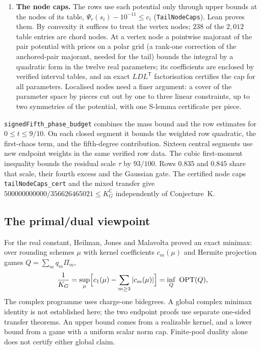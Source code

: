 \documentclass[11pt,a4paper]{article}
\newcommand{\C}{\mathbb{C}}
\newcommand{\KG}{K_G^{\C}}
\newcommand{\lean}[1]{\texttt{\small #1}}
\begin{document}
\begin{enumerate}
 the potential. Lean checks this on the quadratic and affine branches of $\varphi_c(\tau v/\delta)$ in $v=\sqrt U$, with $\delta=3/4$. Convexity gives the bounds
 between witness scales. The kernel checks these polynomial inequalities and the cover of $0\le x\le31/4$.
 The amplitude cover has 38 base intervals. In the active intervals the mixing weight is
 a clipped affine function of $t$. The discount is bounded below by the chord between its
 endpoint weights. Subtracting it leaves a quadratic in the segment parameter, whose
 maximum is checked at the endpoints and at an interior vertex when one is present.
 The other intervals use the tightened scalar rows or a mass tangent.
\item \textbf{The node caps.} The rows use each potential only through upper bounds at the nodes of its table,
 $\Psi_r(s_i)-10^{-11}\le c_i$ (\lean{TailNodeCaps}). Lean proves them. By convexity it suffices to treat the vertex
 nodes; $238$ of the $2{,}012$ table entries are chord nodes. At a vertex node a pointwise majorant of the pair potential
 with prices on a polar grid (a rank-one correction of the anchored-pair majorant, needed for the tail) bounds the
 integral by a quadratic form in the twelve real parameters; its coefficients are enclosed by verified interval tables,
 and an exact $LDL^{\mathsf T}$ factorisation certifies the cap for all parameters. Localised nodes need a finer
 argument: a cover of the parameter space by pieces cut out by one to three linear constraints, up to two symmetries of
 the potential, with one S-lemma certificate per piece.
\end{enumerate}
\lean{signedFifth\_phase\_budget} combines the mass bound and the row estimates for $0\le t\le9/10$.
On each closed segment it bounds the weighted row quadratic, the first-chaos term, and the fifth-degree contribution. Sixteen central segments use new endpoint weights in the same verified row data.
The cubic first-moment inequality bounds the residual scale $\tau$ by $93/100$.
Rows $0.835$ and $0.845$ share that scale, their fourth excess and the Gaussian gate.
The certified node caps \lean{tailNodeCaps\_cert} and the mixed transfer give
$500000000000/356626465021\le\KG$ independently of Conjecture~K.

\subsection{The primal/dual viewpoint}
For the real constant, Heilman, Jones and Malavolta proved an exact minimax: over rounding schemes $\mu$ with kernel
coefficients $c_m(\mu)$ and Hermite projection games $Q=\sum_m q_m\Pi_m$,
\[
 \frac1{K_G}=\sup_\mu\Bigl[c_1(\mu)-\sum_{m\ge3}|c_m(\mu)|\Bigr]=\inf_Q\ \mathrm{OPT}(Q),
\]
The complex programme uses charge-one bidegrees. A global complex minimax identity is not established here;
the two endpoint proofs use separate one-sided transfer theorems. An upper bound comes from a realizable kernel,
and a lower bound from a game with a uniform scalar norm cap. Finite-pool duality alone does not certify either global claim.
\end{document}
